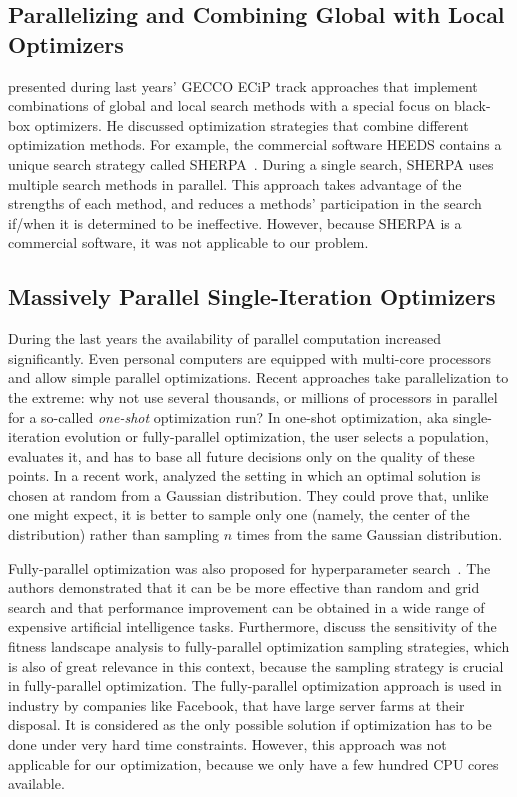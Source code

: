 \documentclass[conference]{IEEEtran}
\begin{document}
\subsection{Parallelizing and  Combining Global with Local Optimizers}\label{sec:comb}
\citet{Good18b} presented during last years' GECCO \gls{ECiP} track approaches that implement combinations of global and local search methods with a special focus on black-box optimizers.
He discussed optimization strategies that combine different optimization methods. 
For example, the commercial software HEEDS contains a unique search strategy called \gls{SHERPA}~\citep{Good08a}.
During a single search, \gls{SHERPA} uses multiple search methods in parallel.
This approach takes advantage of the strengths of each method, and reduces a methods’ participation in the search if/when it is determined to be ineffective.
However, because \gls{SHERPA} is a commercial software, it was not applicable to our problem.

\subsection{Massively Parallel Single-Iteration Optimizers}\label{sec:parallel}
During the last years the availability of parallel computation increased significantly. 
Even personal computers are equipped with multi-core processors and allow simple parallel optimizations. Recent approaches take parallelization to the extreme: why not use several thousands, or millions of processors in parallel for a so-called \emph{one-shot} optimization run?
In one-shot optimization, aka single-iteration evolution or fully-parallel optimization, the user selects a population, evaluates it, and has to base all future decisions only on the quality of these points.
In a recent work, \citet{Cauw20a} analyzed the setting in which an optimal solution is chosen at random from a Gaussian distribution.
They could prove that, unlike one might expect, it is better to sample only one (namely, the center of the distribution) rather than sampling $n$ times from the same Gaussian distribution.

Fully-parallel optimization was also proposed for hyperparameter search~\citep{Cauw20a}.
The authors  demonstrated that it can be be more effective than random and grid search and that performance improvement can be obtained in a wide range of expensive artificial intelligence tasks.
Furthermore, \citet{Rena20a} discuss the sensitivity of the fitness landscape analysis to fully-parallel optimization sampling strategies, which is also of great relevance in this context, because the sampling strategy is crucial in fully-parallel optimization.
The fully-parallel optimization approach is used in industry by companies like Facebook, that have large server farms at their disposal.
It is considered as the only possible solution if optimization has to be done under very hard time constraints. 
However, this approach was not applicable for our optimization, because we only have a few hundred CPU cores available.
\end{document}
